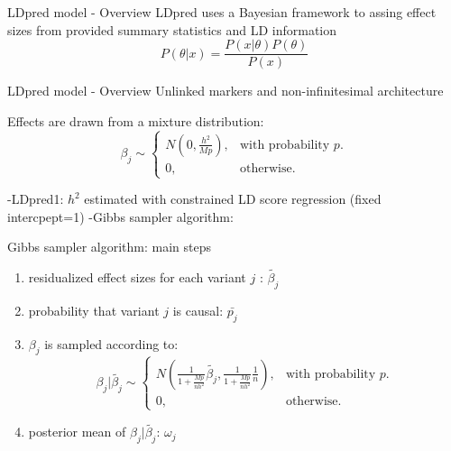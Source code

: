 \documentclass{beamer}
\begin{document}
   \begin{frame}{LDpred model - Overview}
    LDpred uses a Bayesian framework to assing effect sizes from provided summary statistics and LD information
    \begin{equation}
    P(\theta|x)=\frac{P(x|\theta)P(\theta)}{P(x)}
  \end{equation}
\newline
\end{frame}

    \begin{frame}{LDpred model - Overview}
    Unlinked markers and non-infinitesimal architecture\\
    \newline
    
    Effects are drawn from a mixture distribution:
    \begin{equation}
 \beta_{j}\sim\begin{cases}
    N(0, \frac{h^2}{Mp}), & \text{with probability $p$}.\\
    0, & \text{otherwise}.
  \end{cases}
  \end{equation}
\newline

  -LDpred1: $h^2$ estimated with constrained LD score regression (fixed intercpept=1)
  \newline
  -Gibbs sampler algorithm:
  \end{frame}
    
       \begin{frame}{Gibbs sampler algorithm: main steps}
  \begin{enumerate}
    \item residualized effect sizes for each variant $j$ : $\tilde{\beta_{j}}$
      \item probability that variant $j$ is causal: $\bar{p_{j}}$
      \item $\beta_{j}$ is sampled according to:
         \begin{equation}
 \beta_{j}|\tilde{\beta_{j}}\sim\begin{cases}
    N(\frac{1}{1+\frac{Mp}{nh^2}}\tilde{\beta_{j}},\frac{1}{1+\frac{Mp}{nh^2}}\frac{1}{n}), & \text{with probability $p$}.\\
    0, & \text{otherwise}.
  \end{cases}
  \end{equation}
      \item posterior mean of $\beta_{j}|\tilde{\beta_{j}}$: $\omega_{j}$
  
  \end{enumerate}
  
       \end{frame}
       
\end{document}
